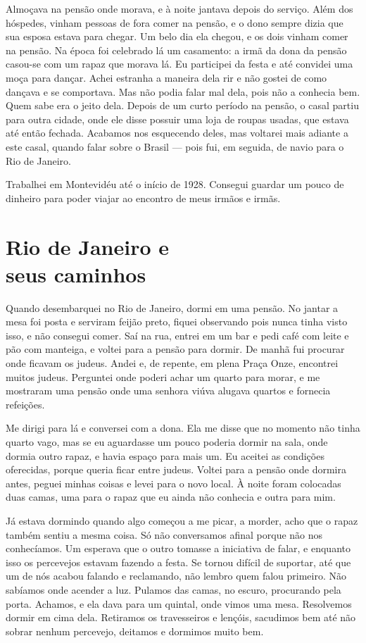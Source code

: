 Almoçava na pensão onde morava, e à noite jantava depois do serviço. Além dos hóspedes, 
vinham pessoas de fora comer na pensão, e o dono sempre
dizia que sua esposa estava para chegar. Um belo dia ela chegou, e os
dois vinham comer na pensão. Na época foi celebrado lá um casamento: a irmã
da dona da pensão casou-se com um rapaz que morava lá. Eu participei da
festa e até convidei uma moça para dançar. Achei estranha a maneira dela 
rir e não gostei de como dançava e se comportava. Mas não podia
falar mal dela, pois não a conhecia bem. Quem sabe era o jeito dela.
Depois de um curto período na pensão, o casal partiu para outra cidade,
onde ele disse possuir uma loja de roupas usadas, que estava até então 
fechada. Acabamos nos esquecendo deles, mas voltarei mais adiante a este
casal, quando falar sobre o Brasil --- pois fui, em seguida, de navio para o
Rio de Janeiro.

Trabalhei em Montevidéu até o início de 1928. Consegui guardar um pouco
de dinheiro para poder viajar ao encontro de meus irmãos e irmãs.

\chapter*{Rio de Janeiro e\\seus caminhos}

Quando desembarquei no Rio de Janeiro, dormi em uma pensão. No
jantar a mesa foi posta e serviram feijão preto, fiquei observando
pois nunca tinha visto isso, e não consegui comer. Saí na rua, entrei
em um bar e pedi café com leite e pão com manteiga, e voltei para a
pensão para dormir. De manhã fui procurar onde ficavam os judeus. Andei
e, de repente, em plena Praça Onze, encontrei muitos judeus.
Perguntei onde poderi achar um quarto para morar, e me
mostraram uma pensão onde uma senhora viúva alugava quartos e fornecia
refeições.

Me dirigi para lá e conversei com a dona. Ela me disse que no
momento não tinha quarto vago, mas se eu aguardasse um
pouco poderia dormir na sala, onde dormia outro rapaz, e havia espaço para mais um. 
Eu aceitei as condições oferecidas, porque
queria ficar entre judeus. Voltei para a pensão onde dormira antes, peguei minhas coisas e levei para o novo local. À noite foram colocadas duas camas, uma para o
rapaz que eu ainda não conhecia e outra para mim.

Já estava dormindo quando algo começou a me picar, a morder, acho que o
rapaz também sentiu a mesma coisa. Só não conversamos afinal porque não nos conhecíamos. Um esperava que o outro tomasse a iniciativa de
falar, e enquanto isso os percevejos estavam fazendo a festa. Se tornou
difícil de suportar, até que um de nós acabou falando e reclamando,
não lembro quem falou primeiro. Não sabíamos onde acender a
luz. Pulamos das camas, no escuro, procurando pela porta.
Achamos, e ela dava para um quintal, onde vimos uma mesa.
Resolvemos dormir em cima dela. Retiramos os travesseiros e lençóis,
sacudimos bem até não sobrar nenhum percevejo, deitamos e dormimos muito
bem.

